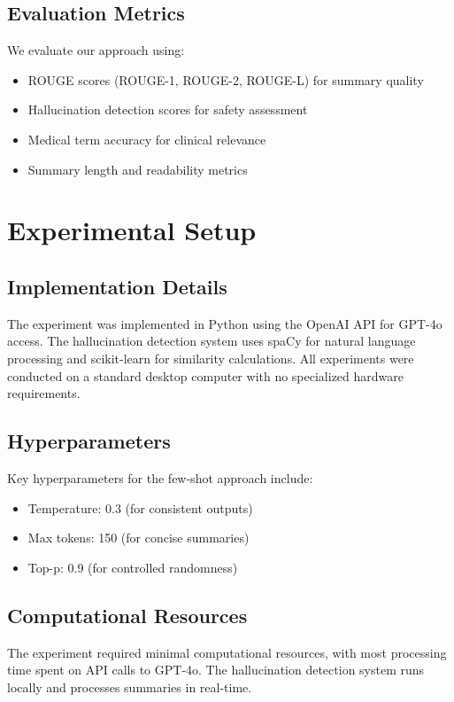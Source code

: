 \documentclass[sigconf]{acmart}
\begin{document}
\subsection{Evaluation Metrics}

We evaluate our approach using:
\begin{itemize}
    \item ROUGE scores (ROUGE-1, ROUGE-2, ROUGE-L) for summary quality
    \item Hallucination detection scores for safety assessment
    \item Medical term accuracy for clinical relevance
    \item Summary length and readability metrics
\end{itemize}

\section{Experimental Setup}

\subsection{Implementation Details}

The experiment was implemented in Python using the OpenAI API for GPT-4o access. The hallucination detection system uses spaCy for natural language processing and scikit-learn for similarity calculations. All experiments were conducted on a standard desktop computer with no specialized hardware requirements.

\subsection{Hyperparameters}

Key hyperparameters for the few-shot approach include:
\begin{itemize}
    \item Temperature: 0.3 (for consistent outputs)
    \item Max tokens: 150 (for concise summaries)
    \item Top-p: 0.9 (for controlled randomness)
\end{itemize}

\subsection{Computational Resources}

The experiment required minimal computational resources, with most processing time spent on API calls to GPT-4o. The hallucination detection system runs locally and processes summaries in real-time.
\end{document}
